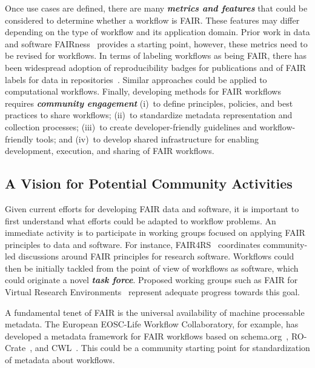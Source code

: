 Once use cases are defined, there are many \textbf{\emph{metrics and features}} that could be considered to determine whether a workflow is FAIR. These features may differ depending on the type of workflow and its application domain. Prior work in data and software FAIRness~\cite{wilkinson2016fair, katz2021taking} provides a starting point, however, these metrics need to be revised for workflows. In terms of labeling workflows as being FAIR, there has been widespread adoption of reproducibility badges for publications and of FAIR labels for data in repositories~\cite{acm-badges}. Similar approaches could be applied to computational workflows. 
%
Finally, developing methods for FAIR workflows requires \textbf{\emph{community engagement}} (i)~to define principles, policies, and best practices to share workflows; (ii)~to standardize metadata representation and collection processes; (iii)~to create developer-friendly guidelines and workflow-friendly tools; and (iv)~to develop shared infrastructure for enabling development, execution, and sharing of FAIR workflows.


\subsection{A Vision for Potential Community Activities}

Given current efforts for developing FAIR data and software, it is important to first understand what efforts could be adapted to workflow problems. An immediate activity is to participate in working groups focused on applying FAIR principles to data and software. For instance, FAIR4RS~\cite{fair4rs} coordinates community-led discussions around FAIR principles for research software. Workflows could then be initially tackled from the point of view of workflows as software, which could originate a novel \textbf{\emph{task force}}. Proposed working groups such as FAIR for Virtual Research Environments~\cite{fair4vre} represent adequate progress towards this goal. 

A fundamental tenet of FAIR is the universal availability of machine processable metadata. The European EOSC-Life Workflow Collaboratory, for example, has developed a metadata framework for FAIR workflows based on schema.org~\cite{bioschemas-ComputationalWorkflow}, RO-Crate~\cite{rocrate}, and CWL~\cite{cwl}. This could be a community starting point for standardization of metadata about workflows.  

